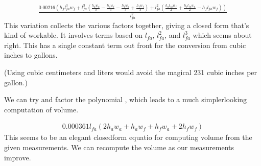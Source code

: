\documentclass[letterpaper,10pt,english]{sphinxmanual}
\begin{document}
\begin{sphinxVerbatim}[commandchars=\\\{\}]
   
\end{sphinxVerbatim}
\begin{equation*}
\begin{split}\displaystyle \frac{0.00216 \left(h_{f} l_{fa}^{3} w_{f} + l_{fa}^{3} \left(\frac{h_{a} w_{a}}{3} - \frac{h_{a} w_{f}}{3} - \frac{h_{f} w_{a}}{3} + \frac{h_{f} w_{f}}{3}\right) + l_{fa}^{2} \left(\frac{h_{a} l_{fa} w_{f}}{2} + \frac{h_{f} l_{fa} w_{a}}{2} - h_{f} l_{fa} w_{f}\right)\right)}{l_{fa}^{2}}\end{split}
\end{equation*}
\sphinxAtStartPar
This variation collects the various factors together, giving a closed form that’s kind of workable. It involves terms based on \(l_{fa}\), \(l_{fa}^2\), and \(l_{fa}^3\) which seems about right. This has a single constant term out front for the conversion from cubic inches to gallons.

\sphinxAtStartPar
(Using cubic centimeters and liters would avoid the magical 231 cubic inches per gallon.)

\sphinxAtStartPar
We can try and factor the polynomial , which leads to a much simpler\sphinxhyphen{}looking computation of volume.

\begin{sphinxVerbatim}[commandchars=\\\{\}]
     
\end{sphinxVerbatim}
\begin{equation*}
\begin{split}\displaystyle 0.000361 l_{fa} \left(2 h_{a} w_{a} + h_{a} w_{f} + h_{f} w_{a} + 2 h_{f} w_{f}\right)\end{split}
\end{equation*}
\sphinxAtStartPar
This seems to be an elegant closed\sphinxhyphen{}form equatio for computing volume from the given measurements. We can recompute the volume as our measurements improve.
\end{document}

